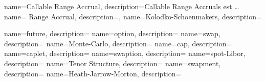 \makeglossaries



{
	name=Callable Range Accrual,
	description=Callable Range Accruals est \dots
}
{
	name= Range Accrual,
	description={},
}
{
	name={Kolodko-Schoenmakers},
	description={}
}

{
	name={future},
	description={}
}
{
	name={option},
	description={}
}
{
	name={swap},
	description={}
}
{
	name={Monte-Carlo},
	description={}
}
{
	name={cap},
	description={}
}
{
	name={caplet},
	description={}
}
{
	name={swaption},
	description={}
}
{
	name={spot-Libor},
	description={}
}
{
	name={Tenor Structure},
	description={}
}
{
	name={swapment},
	description={}
}
{
	name={Heath-Jarrow-Morton},
	description={}
}
